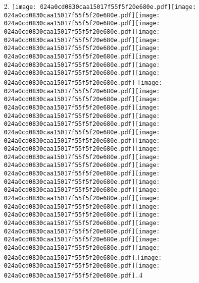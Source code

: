 \documentclass{article}
\newcommand{\origpg}[2]{\texttt{[image: 024a0cd0830caa15017f55f5f20e680e.pdf]}}
\begin{document}
{\vspace{19.754pt}\hspace{36.161pt} 

\vspace{0.626pt}\hspace{18.094pt}2. \origpg2{121.46pt 667.72pt 133.12pt 683.86pt}\origpg2{133.02pt 667.72pt 141.09pt 683.86pt}\hspace{0.339pt}\origpg2{141.43pt 667.72pt 148.6pt 683.86pt}\origpg2{148.64pt 667.72pt 155.7pt 683.86pt}\hspace{0.161pt}\origpg2{155.86pt 667.72pt 163.03pt 683.86pt}\origpg2{163.07pt 667.72pt 171.71pt 683.86pt}\origpg2{171.71pt 667.72pt 179.78pt 683.86pt}\origpg2{179.7pt 667.72pt 187.32pt 683.86pt}\hspace{-0.145pt}\origpg2{187.17pt 667.72pt 195.02pt 683.86pt}\hspace{-0.129pt}\origpg2{194.89pt 667.72pt 202.05pt 683.86pt} \origpg2{205.96pt 667.72pt 212.33pt 683.86pt}\hspace{-0.113pt}\origpg2{212.22pt 667.72pt 219.39pt 683.86pt}\origpg2{219.44pt 667.72pt 227.65pt 683.86pt}\origpg2{227.65pt 667.72pt 234.82pt 683.86pt}\hspace{-0.694pt}\origpg2{234.12pt 667.72pt 242.24pt 683.86pt}\hspace{-0.161pt}\origpg2{242.08pt 667.72pt 250.72pt 683.86pt}\hspace{0.162pt}\origpg2{250.88pt 667.72pt 267.02pt 683.86pt}\origpg2{267.02pt 667.72pt 283.16pt 683.86pt}\hspace{-0.242pt}\origpg2{282.92pt 667.72pt 299.06pt 683.86pt}\origpg2{299.06pt 667.72pt 315.2pt 683.86pt}\origpg2{315.2pt 667.72pt 331.34pt 683.86pt}\hspace{-0.242pt}\origpg2{331.09pt 667.72pt 347.23pt 683.86pt}\origpg2{347.23pt 667.72pt 363.38pt 683.86pt}\hspace{-0.242pt}\origpg2{363.13pt 667.72pt 379.27pt 683.86pt}\origpg2{379.27pt 667.72pt 395.41pt 683.86pt}\origpg2{395.41pt 667.72pt 411.55pt 683.86pt}\origpg2{411.55pt 667.72pt 427.69pt 683.86pt}\hspace{-0.242pt}\origpg2{427.45pt 667.72pt 443.59pt 683.86pt}\origpg2{443.59pt 667.72pt 459.73pt 683.86pt}\origpg2{459.73pt 667.72pt 475.87pt 683.86pt}\hspace{-0.242pt}\origpg2{475.63pt 667.72pt 491.77pt 683.86pt}.\origpg2{495.96pt 667.72pt 512.1pt 683.86pt}\hspace{-0.242pt}\origpg2{511.86pt 667.72pt 528pt 683.86pt}..4 

}
\end{document}
